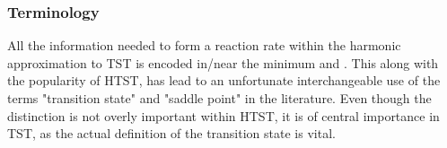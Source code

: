 

\subsubsection{Terminology}
All the information needed to form a reaction rate within the harmonic approximation to TST is encoded in/near the minimum and .
This along with the popularity of HTST, has lead to an unfortunate interchangeable use of the terms "transition state" and "saddle point" in the literature.
Even though the distinction is not overly important within HTST, it is of central importance in TST, as the actual definition of the transition state is vital.




